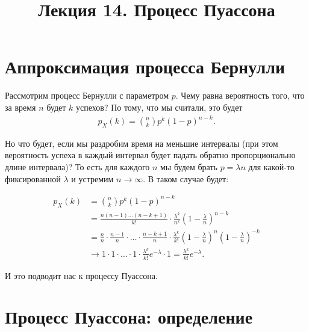 \documentclass[12pt]{article}
\title{Лекция 14. Процесс Пуассона}
\begin{document}
\maketitle

\section{Аппроксимация процесса Бернулли}

Рассмотрим процесс Бернулли с параметром $p$. Чему равна вероятность того, что за время $n$ будет $k$ успехов? По тому, что мы считали, это будет 
\begin{align*}
  p_X(k) = \binom{n}{k} p^k (1 - p)^{n - k}.
\end{align*}

Но что будет, если мы раздробим время на меньшие интервалы (при этом вероятность успеха в каждый интервал будет падать обратно пропорционально длине интервала)? То есть для каждого $n$ мы будем брать $p = {\lambda}{n}$ для какой-то фиксированной $\lambda$ и устремим $n \to \infty$. В таком случае будет:

\begin{align*}
  p_X(k) &= \binom{n}{k} p^k (1 - p)^{n - k} \\
         &= \frac{n(n - 1)\dots(n - k+ 1)}{k!} \cdot \frac{\lambda^k}{n^k} \left(1 - \frac{\lambda}{n}\right)^{n - k} \\
         &= \frac{n}{n} \cdot \frac{n - 1}{n} \cdot \ldots \cdot \frac{n - k + 1}{n} \cdot \frac{\lambda^k}{k!} \left(1 - \frac{\lambda}{n}\right)^n \left(1 - \frac{\lambda}{n}\right)^{-k} \\
         &\to 1 \cdot 1 \cdot \ldots \cdot 1 \cdot \frac{\lambda^k}{k!}e^{-\lambda} \cdot 1 = \frac{\lambda^k}{k!}e^{-\lambda}.
\end{align*}

И это подводит нас к процессу Пуассона.

\section{Процесс Пуассона: определение}
\end{document}
